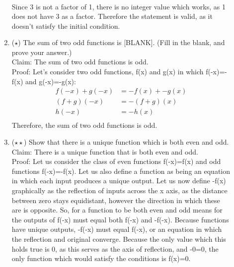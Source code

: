 \documentclass{letter}
\theoremstyle{definition}
\begin{document}
\begin{description}
\begin{enumerate}
\begin{align*}
\end{align*}
Since 3 is not a factor of 1, there is no integer value which works, as 1 does not have 3 as a factor. Therefore the statement is valid, as it doesn't satisfy the initial condition. \\
		\item ($\star$) The sum of two odd functions is [BLANK]. (Fill in the blank, and prove your answer.) \\
Claim: The sum of two odd functions is odd. \\
Proof: Let's consider two odd functions, f(x) and g(x) in which f(-x)=-f(x) and g(-x)=-g(x): \\
\begin{align*}
f(-x) + g(-x) &= -f(x) + -g(x) \tag{addition of two functions} \\
(f+g)(-x) &= -(f+g)(x) \tag{factor our (-x) from left side and (-x) and -1 from right side} \\
h(-x) &= -h(x) \tag{Set f+g=h} \\
\end{align*}
Therefore, the sum of two odd functions is odd. \\

		\item ($\star \star$) Show that there is a unique function which is both even and odd. \\
Claim: There is a unique function that is both even and odd. \\
Proof: Let us consider the class of even functions f(-x)=f(x) and odd functions f(-x)=-f(x). Let us also define a function as being an equation in which each input produces a unique output. Let us now define -f(x) graphically as the reflection of inputs across the x axis, as the distance between zero stays equidistant, however the direction in which these are is opposite. So, for a function to be both even and odd means for the outputs of f(-x) must equal both f(-x) and -f(-x). Because functions have unique outputs, -f(-x) must equal f(-x), or an equation in which the reflection and original converge. Because the only value which this holds true is 0, as this serves as the axis of reflection, and -0=0, the only function which would satisfy the conditions is f(x)=0.  
\end{enumerate}
\end{description}
\end{document}
